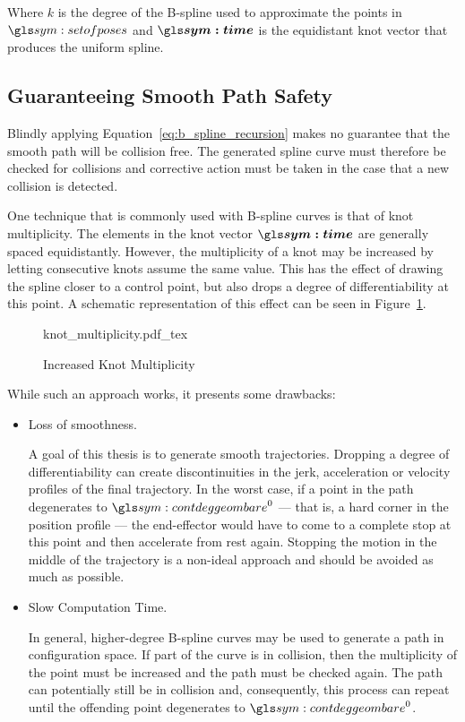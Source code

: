 	Where $k$ is the degree of the B-spline used to approximate the points in
	$\setofposes$ and $\vec{\timesym}$ is the equidistant knot vector that
	produces the uniform spline.

	\subsection{Guaranteeing Smooth Path Safety}%
	\label{sec:guaranteeing_smooth_path_safety}

		Blindly applying Equation~\ref{eq:b_spline_recursion} makes no guarantee
		that the smooth path will be collision free. The generated spline curve
		must therefore be checked for collisions and corrective action must be
		taken in the case that a new collision is detected.

		One technique that is commonly used with B-spline curves is that of knot
		multiplicity. The elements in the knot vector
		$\vec{\timesym}$ are generally spaced
		equidistantly. However, the multiplicity of a knot may be increased by
		letting consecutive knots assume the same value. This has the effect of
		drawing the spline closer to a control point, but also drops a degree of
		differentiability at this point. A schematic representation of this
		effect can be seen in Figure~\ref{fig:knot_multiplicity}.

		\begin{figure}[hb]
			\centering
			\def\svgwidth{\columnwidth}
			{knot_multiplicity.pdf_tex}
			\caption{Increased Knot Multiplicity}%
			\label{fig:knot_multiplicity}
		\end{figure}

		While such an approach works, it presents some drawbacks:

		\begin{itemize}

			\item Loss of smoothness.

				A goal of this thesis is to generate smooth trajectories.
				Dropping a degree of differentiability can create
				discontinuities in the jerk, acceleration or velocity profiles
				of the final trajectory. In the worst case, if a point in the
				path degenerates to $\contdeggeom{0}$ --- that is, a hard corner
				in the position profile --- the end-effector would have to come
				to a complete stop at this point and then accelerate from rest
				again. Stopping the motion in the middle of the trajectory is a
				non-ideal approach and should be avoided as much as possible.

			\item Slow Computation Time.

				In general, higher-degree B-spline curves may be used to
				generate a path in configuration space. If part of the curve is
				in collision, then the multiplicity of the point must be
				increased and the path must be checked again. The path can
				potentially still be in collision and, consequently, this
				process can repeat until the offending point degenerates to
				$\contdeggeom{0}$.

		\end{itemize}

